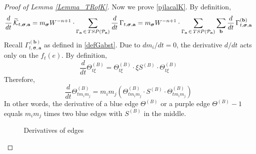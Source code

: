\documentclass[10pt,reqno]{article}
\theoremstyle{plain} %
\theoremstyle{remark}
\numberwithin{equation}{section}
\begin{document}
\begin{proof}[Proof of Lemma \ref{Lemma_TRofK}]
\medskip
Now we prove \eqref{pjlacalK}. By definition,
$$
      \frac{d}{dt}\, \widetilde{ {\cal K}}_{t, \boldsymbol{\sigma}, \textbf{a}} =
     m_{\boldsymbol{\sigma}} W^{-n+1}\cdot \sum_{\Gamma_{\textbf{a}}\, \in\,  {TSP}({\cal P}_{\textbf{a}})} 
       \frac{d}{dt}\, \Gamma_{t, \boldsymbol{\sigma}
       , \textbf{a}}
       =   m_{\boldsymbol{\sigma}} W^{-n+1}\cdot \sum_{\Gamma_{\textbf{a}}\, \in\,  {TSP}({\cal P}_{\textbf{a}})}
       \sum_{\textbf{b}}
       \frac{d}{dt} \, \Gamma^{(\textbf{b})}_{t, \boldsymbol{\sigma}
       , \textbf{a}}
$$
 Recall $\Gamma^{(\textbf{b})}_{t, \boldsymbol{\sigma}, \textbf{a}}$ as defined in \eqref{defGabst}. 
 Due to $ d m_i/dt = 0$, the derivative $d/dt$  acts only on the $f_t(e)$.   By definition, 
$$
\frac{d}{dt} \Theta^{(B)}_{t \xi} = \Theta^{(B)}_{t \xi} \cdot \xi S^{(B)} \cdot \Theta^{(B)}_{t \xi}
$$
Therefore, 
$$
\frac{d}{dt} \Theta^{(B)}_{t m_i m_j} = m_i m_j \left( \Theta^{(B)}_{t m_i m_j} \cdot S^{(B)} \cdot \Theta^{(B)}_{t m_i m_j}\right)
$$
In other words, the derivative of a blue edge $\Theta^{(B)}$ or a purple edge $\Theta^{(B)} - 1$ equals $m_i m_j$ times two blue edges with $S^{(B)}$ in the middle.

\begin{figure}[ht]
    \centering
    \caption{Derivatives of edges}
\end{figure}



\end{proof}
\end{document}
